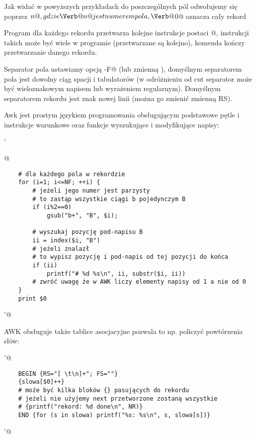 
Jak widać w powyższych przykładach do poszczególnych pól odwołujemy się poprzez \Verb@$n@,
gdzie \Verb@n@ jest numerem pola, \Verb@$0@ oznacza cały rekord

Program dla każdego rekordu przetwarza kolejne instrukcje postaci @,
instrukcji takich może być wiele w programie (przetwarzane są kolejno),
komenda \Verb@next@ kończy przetwarzanie danego rekordu.

Separator pola ustawiamy opcją \Verb@-F@ (lub zmienną \Verb@FS@),
domyślnym separatorem pola jest dowolny ciąg spacji i tabulatorów
(w odróżnieniu od cut separator może być wieloznakowym napisem lub wyrażeniem regularnym).
Domyślnym separatorem rekordu jest znak nowej linii (można go zmienić zmienną RS).

Awk jest prostym językiem programowania obsługującym podstawowe pętle i instrukcje warunkowe
oraz funkcje wyszukujące i modyfikujące napisy:

\begin{oframed}\noindent{}\Verb@ '{@\vspace{-0.95em}
\begin{verbatim}
	# dla każdego pola w rekordzie
	for (i=1; i<=NF; ++i) {
		# jeżeli jego numer jest parzysty
		# to zastąp wszystkie ciągi b pojedynczym B
		if (i%2==0)
			gsub("b+", "B", $i);
		
		# wyszukaj pozycję pod-napisu B
		ii = index($i, "B")
		# jeżeli znalazł
		# to wypisz pozycję i pod-napis od tej pozycji do końca
		if (ii)
			printf("# %d %s\n", ii, substr($i, ii))
		# zwróć uwagę że w AWK liczy elementy napisy od 1 a nie od 0
	}
	print $0
\end{verbatim}
\vspace{-0.95em}\Verb@}'@\end{oframed}

\noindent
AWK obsługuje także tablice asocjacyjne pozwala to np. policzyć powtórzenia słów:

\begin{oframed}\noindent{}\Verb@ '@\vspace{-0.95em}
\begin{verbatim}
	BEGIN {RS="[ \t\n]+"; FS=""}
	{slowa[$0]++}
	# może być kilka bloków {} pasujących do rekordu
	# jeżeli nie użyjemy next przetworzone zostaną wszystkie
	# {printf("rekord: %d done\n", NR)}
	END {for (s in slowa) printf("%s: %s\n", s, slowa[s])}
\end{verbatim}
\vspace{-0.95em}\Verb@'@\end{oframed}

